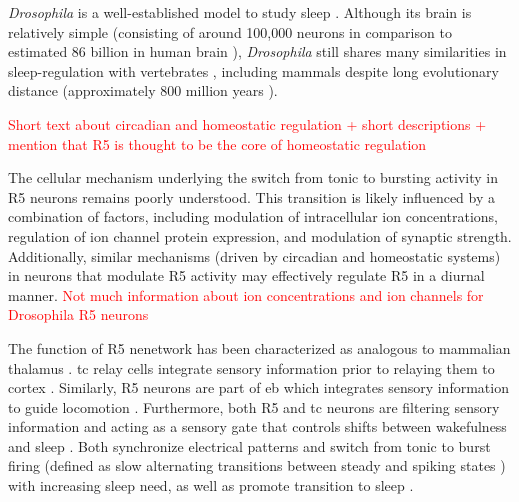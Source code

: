 \documentclass[../main.tex]{subfiles}
\begin{document}
\textit{Drosophila} is a well-established model to study sleep 
\cite{liuSleepDriveEncoded2016,andreaniCircadianProgrammingEllipsoid2022,shaferRegulationDrosophilaSleep2021,dubowyCircadianRhythmsSleep2017}.
Although its brain is relatively simple (consisting of around 100,000 neurons \cite{donleaRecurrentCircuitryBalancing2018} in comparison to
estimated 86 billion in human brain \cite{herculano-houzelRemarkableNotExtraordinary2012}), \textit{Drosophila} still
shares many similarities in sleep-regulation with vertebrates \cite{liuSleepDriveEncoded2016}, including
mammals \cite{suarez-grimaltNeuralArchitectureSleep2021,dubowyCircadianRhythmsSleep2017} despite long
evolutionary distance (approximately 800 million years \cite{williamsLongReachNAAG2021}).

\textcolor{red}{Short text about circadian and homeostatic regulation + short descriptions
+ mention that R5 is thought to be the core of homeostatic regulation}

The cellular mechanism underlying the switch from tonic to bursting activity in R5 neurons remains poorly understood.
This transition is likely influenced by a combination of factors, including modulation of intracellular ion concentrations,
regulation of ion channel protein expression, and modulation of synaptic strength. Additionally, similar mechanisms
(driven by circadian and homeostatic systems) in neurons that modulate R5 activity may effectively regulate
R5 in a diurnal manner. 
\textcolor{red}{Not much information about ion concentrations and ion channels for Drosophila R5 neurons}

The function of R5 nenetwork has been characterized as analogous to mammalian thalamus
\cite{suarez-grimaltNeuralArchitectureSleep2021,raccugliaNetworkSpecificSynchronizationElectrical2019}.
\gls{tc} relay cells integrate sensory information prior to relaying them to cortex \cite{sampathkumarIntegrationSignalsDifferent2021}.
Similarly, R5 neurons are part of \gls{eb} which integrates sensory information to guide locomotion \cite{yanSubtypeSpecificRolesEllipsoid2023}. 
Furthermore, both R5 and \gls{tc} neurons are filtering sensory information and acting as a
sensory gate that controls shifts between wakefulness and sleep
\cite{raccugliaCoherentMultilevelNetwork2022,gentThalamicDualControl2018}. Both
synchronize electrical patterns and switch from tonic to burst firing (defined as slow alternating transitions between steady and spiking states
\cite{rinzelFormalClassificationBursting1987}) with increasing sleep need, as well as promote transition to sleep
\cite{suarez-grimaltNeuralArchitectureSleep2021, raccugliaNetworkSpecificSynchronizationElectrical2019}.
\end{document}
